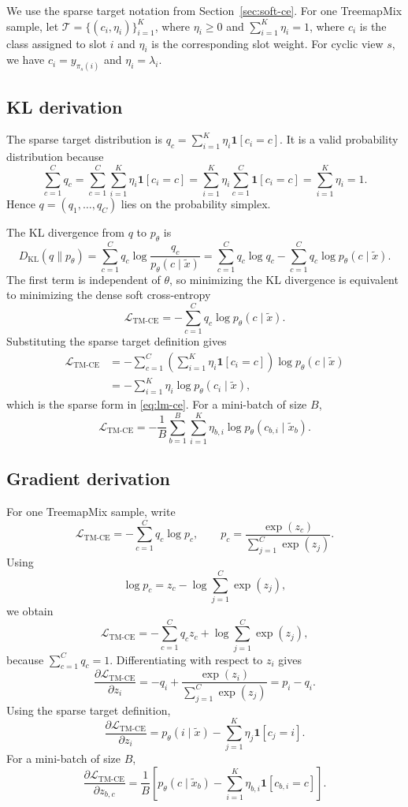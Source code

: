 We use the sparse target notation from Section~\ref{sec:soft-ce}. For one TreemapMix sample, let \(\mathcal{T}=\{(c_i,\eta_i)\}_{i=1}^{K}\), where \(\eta_i\ge 0\) and \(\sum_{i=1}^{K}\eta_i=1\),
where $c_i$ is the class assigned to slot $i$ and $\eta_i$ is the corresponding slot weight. For cyclic view $s$, we have $c_i=y_{\pi_s(i)}$ and $\eta_i=\lambda_i$.

\subsection{KL derivation}

The sparse target distribution is \(q_c=\sum_{i=1}^{K}\eta_i\mathbf{1}[c_i=c]\).
It is a valid probability distribution because
\[
\sum_{c=1}^{C}q_c
=
\sum_{c=1}^{C}
\sum_{i=1}^{K}
\eta_i\mathbf{1}[c_i=c]
=
\sum_{i=1}^{K}
\eta_i
\sum_{c=1}^{C}
\mathbf{1}[c_i=c]
=
\sum_{i=1}^{K}\eta_i
=
1.
\]
Hence $q=(q_1,\dots,q_C)$ lies on the probability simplex.

The KL divergence from $q$ to $p_\theta$ is
\[
D_{\mathrm{KL}}(q\|p_\theta)
=
\sum_{c=1}^{C}
q_c\log\frac{q_c}{p_\theta(c\mid\tilde{x})}
=
\sum_{c=1}^{C}q_c\log q_c
-
\sum_{c=1}^{C}q_c\log p_\theta(c\mid\tilde{x}).
\]
The first term is independent of $\theta$, so minimizing the KL divergence is equivalent to minimizing the dense soft cross-entropy
\[
\mathcal{L}_{\mathrm{TM\text{-}CE}}
=
-\sum_{c=1}^{C}
q_c\log p_\theta(c\mid\tilde{x}).
\]
Substituting the sparse target definition gives
\[
\begin{aligned}
\mathcal{L}_{\mathrm{TM\text{-}CE}}
&=
-\sum_{c=1}^{C}
\left(
\sum_{i=1}^{K}
\eta_i\mathbf{1}[c_i=c]
\right)
\log p_\theta(c\mid\tilde{x}) \\
&=
-\sum_{i=1}^{K}
\eta_i\log p_\theta(c_i\mid\tilde{x}),
\end{aligned}
\]
which is the sparse form in \eqref{eq:lm-ce}. For a mini-batch of size $B$,
\[
\mathcal{L}_{\mathrm{TM\text{-}CE}}
=
-\frac{1}{B}
\sum_{b=1}^{B}
\sum_{i=1}^{K}
\eta_{b,i}\log p_\theta(c_{b,i}\mid\tilde{x}_b).
\]

\subsection{Gradient derivation}

For one TreemapMix sample, write
\[
\mathcal{L}_{\mathrm{TM\text{-}CE}}
=
-\sum_{c=1}^{C}q_c\log p_c,
\qquad
p_c=
\frac{\exp(z_c)}{\sum_{j=1}^{C}\exp(z_j)}.
\]
Using
\[
\log p_c
=
z_c-\log\sum_{j=1}^{C}\exp(z_j),
\]
we obtain
\[
\mathcal{L}_{\mathrm{TM\text{-}CE}}
=
-\sum_{c=1}^{C}q_c z_c
+
\log\sum_{j=1}^{C}\exp(z_j),
\]
because $\sum_{c=1}^{C}q_c=1$. Differentiating with respect to $z_i$ gives
\[
\frac{\partial \mathcal{L}_{\mathrm{TM\text{-}CE}}}{\partial z_i}
=
-q_i
+
\frac{\exp(z_i)}{\sum_{j=1}^{C}\exp(z_j)}
=
p_i-q_i.
\]
Using the sparse target definition,
\[
\frac{\partial \mathcal{L}_{\mathrm{TM\text{-}CE}}}{\partial z_i}
=
p_\theta(i\mid\tilde{x})
-
\sum_{j=1}^{K}
\eta_j\mathbf{1}[c_j=i].
\]
For a mini-batch of size $B$,
\[
\frac{\partial \mathcal{L}_{\mathrm{TM\text{-}CE}}}{\partial z_{b,c}}
=
\frac{1}{B}
\left[
p_\theta(c\mid\tilde{x}_b)
-
\sum_{i=1}^{K}
\eta_{b,i}\mathbf{1}[c_{b,i}=c]
\right].
\]

